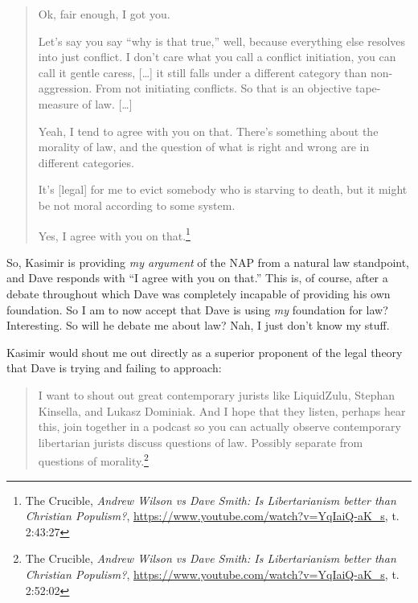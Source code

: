 \documentclass[11pt]{article}
\begin{document}
\begin{quote}
Ok, fair enough, I got you.

Let's say you say ``why is that true,'' well, because everything else resolves into just conflict. I don't care what you call a conflict initiation, you can call it gentle caress, [\ldots{}] it still falls under a different category than non-aggression. From not initiating conflicts. So that is an objective tape-measure of law. [\ldots{}]

Yeah, I tend to agree with you on that. There's something about the morality of law, and the question of what is right and wrong are in different categories.

It's [legal] for me to evict somebody who is starving to death, but it might be not moral according to some system.

Yes, I agree with you on that.\footnote{The Crucible, \emph{Andrew Wilson vs Dave Smith: Is Libertarianism better than Christian Populism?}, \url{https://www.youtube.com/watch?v=YqIaiQ-aK\_s}, t. 2:43:27}
\end{quote}

So, Kasimir is providing \emph{my argument} of the NAP from a natural law standpoint, and Dave responds with ``I agree with you on that.'' This is, of course, after a debate throughout which Dave was completely incapable of providing his own foundation. So I am to now accept that Dave is using \emph{my} foundation for law? Interesting. So will he debate me about law? Nah, I just don't know my stuff.

Kasimir would shout me out directly as a superior proponent of the legal theory that Dave is trying and failing to approach:
\begin{quote}
I want to shout out great contemporary jurists like LiquidZulu, Stephan Kinsella, and Lukasz Dominiak. And I hope that they listen, perhaps hear this, join together in a podcast so you can actually observe contemporary libertarian jurists discuss questions of law. Possibly separate from questions of morality.\footnote{The Crucible, \emph{Andrew Wilson vs Dave Smith: Is Libertarianism better than Christian Populism?}, \url{https://www.youtube.com/watch?v=YqIaiQ-aK\_s}, t. 2:52:02}
\end{quote}
\end{document}
